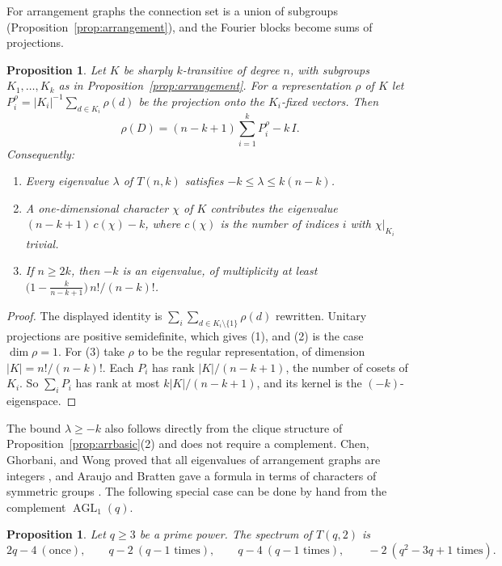 \documentclass[12pt,letterpaper]{article}
\numberwithin{equation}{section}
\newtheorem{proposition}[theorem]{Proposition}
\theoremstyle{definition}
\DeclareMathOperator{\agll}{AGL}
\begin{document}
For arrangement graphs the connection set is a union of subgroups (Proposition~\ref{prop:arrangement}), and the Fourier blocks become sums of projections.
\begin{proposition}\label{prop:projections}
Let $K$ be sharply $k$-transitive of degree $n$, with subgroups $K_1,\ldots,K_k$ as in Proposition~\ref{prop:arrangement}. For a representation $\rho$ of $K$ let $P_i^\rho=|K_i|^{-1}\sum_{d\in K_i}\rho(d)$ be the projection onto the $K_i$-fixed vectors. Then
\[
\rho(D)=(n-k+1)\sum_{i=1}^kP_i^\rho-k\,I.
\]
Consequently:
\begin{enumerate}
\item Every eigenvalue $\lambda$ of $T(n,k)$ satisfies $-k\leq\lambda\leq k(n-k)$.
\item A one-dimensional character $\chi$ of $K$ contributes the eigenvalue $(n-k+1)\,c(\chi)-k$, where $c(\chi)$ is the number of indices $i$ with $\chi|_{K_i}$ trivial.
\item If $n\geq2k$, then $-k$ is an eigenvalue, of multiplicity at least $\bigl(1-\tfrac{k}{n-k+1}\bigr)\,n!/(n-k)!$.
\end{enumerate}
\end{proposition}
\begin{proof}
The displayed identity is $\sum_i\sum_{d\in K_i\setminus\{1\}}\rho(d)$ rewritten. Unitary projections are positive semidefinite, which gives (1), and (2) is the case $\dim\rho=1$. For (3) take $\rho$ to be the regular representation, of dimension $|K|=n!/(n-k)!$. Each $P_i$ has rank $|K|/(n-k+1)$, the number of cosets of $K_i$. So $\sum_iP_i$ has rank at most $k|K|/(n-k+1)$, and its kernel is the $(-k)$-eigenspace.
\end{proof}
The bound $\lambda\geq-k$ also follows directly from the clique structure of Proposition~\ref{prop:arrbasic}(2) and does not require a complement. Chen, Ghorbani, and Wong proved that all eigenvalues of arrangement graphs are integers \cite{CGW14}, and Araujo and Bratten gave a formula in terms of characters of symmetric groups \cite{AB16}. The following special case can be done by hand from the complement $\agll_1(q)$.
\begin{proposition}\label{prop:tq2}
Let $q\geq3$ be a prime power. The spectrum of $T(q,2)$ is
\[
2q-4\ (\text{once}),\qquad q-2\ (q-1\text{ times}),\qquad q-4\ (q-1\text{ times}),\qquad -2\ (q^2-3q+1\text{ times}).
\]
\end{proposition}
\end{document}
